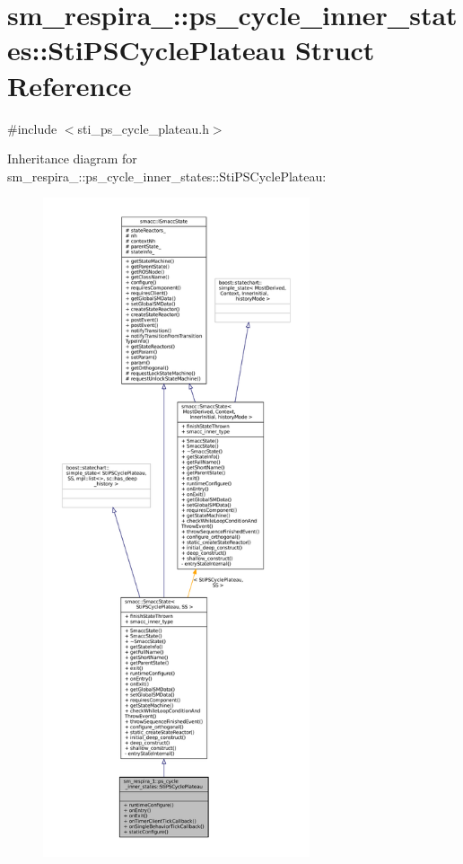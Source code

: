 \hypertarget{structsm__respira__1_1_1ps__cycle__inner__states_1_1StiPSCyclePlateau}{}\section{sm\+\_\+respira\+\_\+:\+:ps\+\_\+cycle\+\_\+inner\+\_\+states\+:\+:Sti\+P\+S\+Cycle\+Plateau Struct Reference}
\label{structsm__respira__1_1_1ps__cycle__inner__states_1_1StiPSCyclePlateau}


{\ttfamily \#include $<$sti\+\_\+ps\+\_\+cycle\+\_\+plateau.\+h$>$}



Inheritance diagram for sm\+\_\+respira\+\_\+:\+:ps\+\_\+cycle\+\_\+inner\+\_\+states\+:\+:Sti\+P\+S\+Cycle\+Plateau\+:
\nopagebreak
\begin{figure}[H]
\begin{center}
\leavevmode
\includegraphics[height=550pt]{structsm__respira__1_1_1ps__cycle__inner__states_1_1StiPSCyclePlateau__inherit__graph}
\end{center}
\end{figure}


